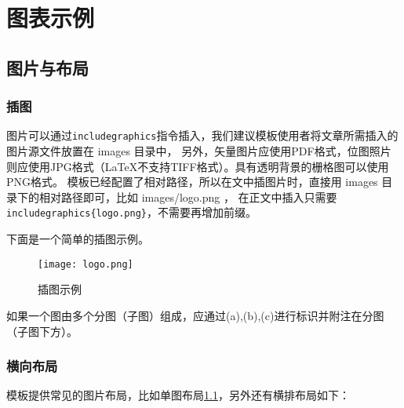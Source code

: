 %
%
%
%
%

\chapter{图表示例}

\section{图片与布局}

\subsection{插图}

图片可以通过\verb|includegraphics|指令插入，我们建议模板使用者将文章所需插入的图片源文件放置在 images 目录中，
另外，矢量图片应使用PDF格式，位图照片则应使用JPG格式（LaTeX不支持TIFF格式）。具有透明背景的栅格图可以使用PNG格式。
模板已经配置了相对路径，所以在文中插图片时，直接用 images 目录下的相对路径即可，比如 images/logo.png ，
在正文中插入只需要\verb|includegraphics{logo.png}|，不需要再增加前缀。

下面是一个简单的插图示例。

\begin{figure}[hbt]
    \centering
    \texttt{[image: logo.png]}
    \caption{插图示例}
    \label{f.example}
\end{figure}


如果一个图由多个分图（子图）组成，应通过(a),(b),(c)进行标识并附注在分图（子图下方）。

\subsection{横向布局}

模板提供常见的图片布局，比如单图布局\ref{f.example}，另外还有横排布局如下：

